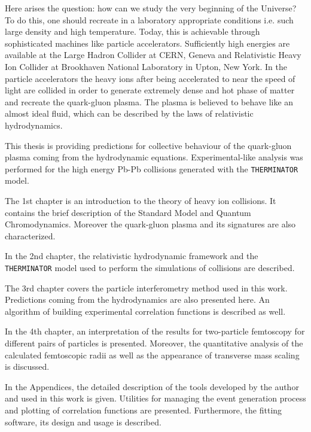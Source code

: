 Here arises the question: how can we study the very beginning of the Universe?
To do this, one should recreate in a laboratory appropriate conditions i.e. such large density and high temperature.
Today, this is achievable through sophisticated machines like particle accelerators.
Sufficiently high energies are available at the Large Hadron Collider at CERN, Geneva and Relativistic Heavy Ion Collider at Brookhaven National Laboratory in Upton, New York.
In the particle accelerators the heavy ions after being accelerated to near the speed of light are collided in order to generate extremely dense and hot phase of matter and recreate the quark-gluon plasma.
The plasma is believed to behave like an almost ideal fluid, which can be described by the laws of relativistic hydrodynamics.

This thesis is providing predictions for collective behaviour of the quark-gluon plasma coming from the hydrodynamic equations.
Experimental-like analysis was performed for the high energy Pb-Pb collisions generated with the \verb|THERMINATOR| model.

The 1st chapter is an introduction to the theory of heavy ion collisions.
It contains the brief description of the Standard Model and Quantum Chromodynamics.
Moreover the quark-gluon plasma and its signatures are also characterized.

In the 2nd chapter, the relativistic hydrodynamic framework and the \verb|THERMINATOR| model used to perform the simulations of collisions are described.

The 3rd chapter covers the particle interferometry method used in this work.
Predictions coming from the hydrodynamics are also presented here.
An algorithm of building experimental correlation functions is described as well.

In the 4th chapter, an interpretation of the results for two-particle femtoscopy for different pairs of particles is presented.
Moreover, the quantitative analysis of the calculated femtoscopic radii as well as the appearance of transverse mass scaling is discussed.

In the Appendices, the detailed description of the tools developed by the author and used in this work is given.
Utilities for managing the event generation process and plotting of correlation functions are presented.
Furthermore, the fitting software, its design and usage is described.